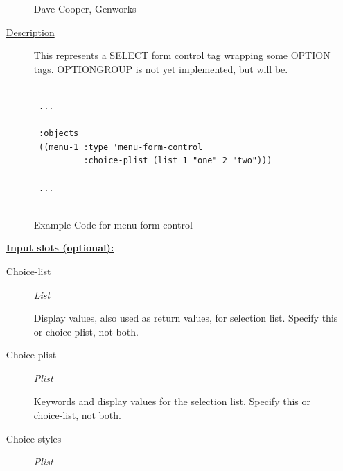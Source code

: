 \documentclass [11pt]{book}
\begin{document}
\begin{itemize}
\begin{description}
Dave Cooper, Genworks



\item [
\underline{Description}]


This represents a SELECT form control tag wrapping some OPTION tags.
OPTIONGROUP is not yet implemented, but will be.



\end{description}




\begin{figure}
\begin{lrbox}{\boxedverb}
\begin{minipage}{\linewidth}
{\small

\begin{verbatim}

 ...
 
 :objects
 ((menu-1 :type 'menu-form-control
          :choice-plist (list 1 "one" 2 "two")))

 ...


\end{verbatim}}
\end{minipage}
\end{lrbox}
\fbox{\usebox{\boxedverb}}

\caption{Example Code for menu-form-control}

\label{fig:example-code-menu-form-control}

\end{figure}





\textbf{
\underline{Input slots (optional):}}

\begin{description}

\item [Choice-list]
\emph{List}

 Display values, also used as return values, for selection list. Specify this or choice-plist, not both.




\item [Choice-plist]
\emph{Plist}

 Keywords and display values for the selection list. Specify this or choice-list, not both.




\item [Choice-styles]
\emph{Plist}


\end{description}
\end{itemize}
\end{document}
